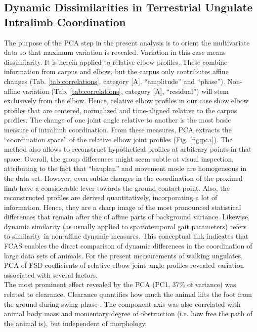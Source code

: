 \subsection{Dynamic Dissimilarities in Terrestrial Ungulate Intralimb Coordination}
The purpose of the PCA step in the present analysis is to orient the multivariate data so that maximum variation is revealed.
Variation in this case means dissimilarity.
It is herein applied to relative elbow profiles.
These combine information from carpus and elbow, but the carpus only contributes affine changes (Tab. \ref{tab:correlations}, category [A], ``amplitude'' and ``phase'').
Non-affine variation (Tab. \ref{tab:correlations}, category [A], ``residual'') will stem exclusively from the elbow.
Hence, relative elbow profiles in our case show elbow profiles that are centered, normalized and time-aligned relative to the carpus profiles.
The change of one joint angle relative to another is the most basic measure of intralimb coordination.
From these measures, PCA extracts the ``coordination space'' of the relative elbow joint profiles (Fig. \ref{fig:pca}).
The method also allows to reconstruct hypothetical profiles at arbitrary points in that space.
Overall, the group differences might seem subtle at visual inspection, attributing to the fact that ``bauplan'' and movement mode are homogeneous in the data set.
However, even subtle changes in the coordination of the proximal limb have a considerable lever towards the ground contact point.
Also, the reconstructed profiles are derived quantitatively, incorporating a lot of information.
Hence, they are a sharp image of the most pronounced statistical differences that remain after the  of affine parts of background variance.
Likewise, dynamic similarity (as usually applied to spatiotemporal gait parameters) refers to similarity in non-affine dynamic measures.
This conceptual link indicates that FCAS enables the direct comparison of dynamic differences in the coordination of large data sets of animals.
For the present measurements of walking ungulates, PCA of FSD coefficients of relative elbow joint angle profiles revealed variation associated with several factors.
\smallskip\\The most prominent effect revealed by the PCA (PC1, $37\%$ of variance) was related to clearance.
Clearance quantifies how much the animal lifts the foot from the ground during swing phase \citep{Austin1999,MacLellan2010,Perrot2011}.
The component axis was also correlated with animal body mass and momentary degree of obstruction (i.e. how free the path of the animal is), but independent of morphology.
